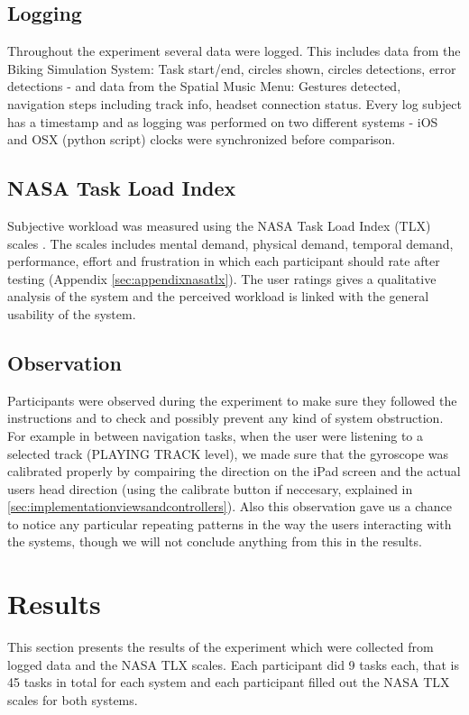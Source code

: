 \subsection{Logging}
Throughout the experiment several data were logged. This includes data from the Biking Simulation System: Task start/end, circles shown, circles detections, error detections - and data from the Spatial Music Menu: Gestures detected, navigation steps including track info, headset connection status. Every log subject has a timestamp and as logging was performed on two different systems - iOS and OSX (python script) clocks were synchronized before comparison.


\subsection{NASA Task Load Index}
Subjective workload was measured using the NASA Task Load Index (TLX) scales \cite{hart_workload_1990}. The scales includes mental demand, physical demand, temporal demand, performance, effort and frustration in which each participant should rate after testing (Appendix \ref{sec:appendixnasatlx}). The user ratings gives a qualitative analysis of the system and the perceived workload is linked with the general usability of the system.

\subsection{Observation}
Participants were observed during the experiment to make sure they followed the instructions and to check and possibly prevent any kind of system obstruction. For example in between navigation tasks, when the user were listening to a selected track (PLAYING TRACK level), we made sure that the gyroscope was calibrated properly by compairing the direction on the iPad screen and the actual users head direction (using the calibrate button if neccesary, explained in \ref{sec:implementationviewsandcontrollers}). Also this observation gave us a chance to notice any particular repeating patterns in the way the users interacting with the systems, though we will not conclude anything from this in the results.


\section{Results}
This section presents the results of the experiment which were collected from logged data and the NASA TLX scales. Each participant did 9 tasks each, that is 45 tasks in total for each system and each participant filled out the NASA TLX scales for both systems.

